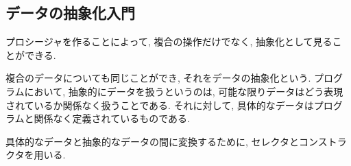 \subsection{データの抽象化入門}
プロシージャを作ることによって, 複合の操作だけでなく,
抽象化として見ることができる.

複合のデータについても同じことができ, それをデータの抽象化という.
プログラムにおいて, 抽象的にデータを扱うというのは,
可能な限りデータはどう表現されているか関係なく扱うことである.
それに対して, 具体的なデータはプログラムと関係なく定義されているものである.

具体的なデータと抽象的なデータの間に変換するために, セレクタとコンストラクタを用いる.
%

%

%

